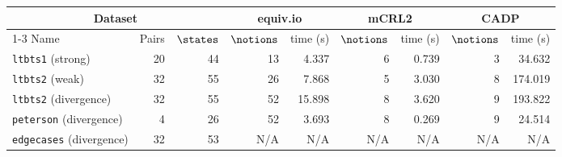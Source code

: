 \begin{longtable}{lrr rr rr rr}
\hline
\multicolumn{3}{c}{Dataset} & \multicolumn{2}{c}{equiv.io} & \multicolumn{2}{c}{mCRL2} & \multicolumn{2}{c}{CADP} \\
\cline{1-3}\cline{4-5}\cline{6-7}\cline{8-9}
Name & Pairs & $\states$ & $\notions$ & time (s) & $\notions$ & time (s) & $\notions$ & time (s) \\
\hline
\endhead
\texttt{ltbts1} (strong) & 20 & 44 & 13 & 4.337 & 6 & 0.739 & 3 & 34.632 \\
\texttt{ltbts2} (weak) & 32 & 55 & 26 & 7.868 & 5 & 3.030 & 8 & 174.019 \\
\texttt{ltbts2} (divergence) & 32 & 55 & 52 & 15.898 & 8 & 3.620 & 9 & 193.822 \\
\texttt{peterson} (divergence) & 4 & 26 & 52 & 3.693 & 8 & 0.269 & 9 & 24.514 \\
\texttt{edgecases} (divergence) & 32 & 53 & N/A & N/A & N/A & N/A & N/A & N/A \\
\hline
\end{longtable}


